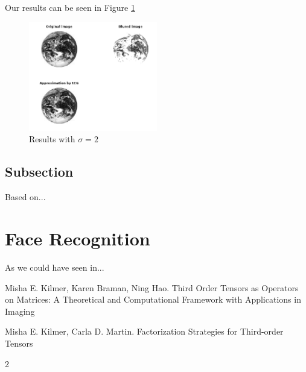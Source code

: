 \documentclass[twoside]{article}
\begin{document}
\begin{multicols}{2}
\noindent Our results can be seen in Figure \ref{fig:resdeblur}
\begin{figure}[H]
\includegraphics[width=0.5\textwidth]{res}
\caption{Results with $\sigma=2$}
\label{fig:resdeblur}
\end{figure}
\subsection{Subsection}
Based on...


\section{Face Recognition}
As we could have seen in...





\begin{thebibliography}{99}

Misha E. Kilmer, Karen Braman, Ning Hao.
\newblock Third Order Tensors as Operators on Matrices: A
Theoretical and Computational Framework with
Applications in Imaging

Misha E. Kilmer, Carla D. Martin.
\newblock Factorization Strategies for Third-order Tensors

 
\end{thebibliography}


\end{multicols}{2}
\end{document}
